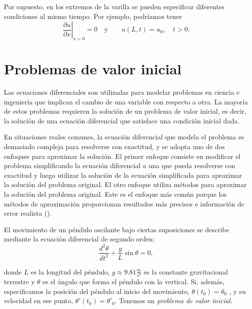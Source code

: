 \documentclass[
  spanish,
  us-letterpaper,
]{scrreprt}
\theoremstyle{definition}
\theoremstyle{plain}
\theoremstyle{remark}
\begin{document}
Por supuesto, en los extremos de la varilla se pueden especificar
diferentes condiciones al mismo tiempo. Por ejemplo, podríamos tener \[
\left. \dfrac{\partial u}{\partial x} \right|_{x=0} =0 \quad \text{y} \qquad u(L,t)=u_0, \quad t>0.
\]

\chapter{Problemas de valor inicial}\label{problemas-de-valor-inicial}

Las ecuaciones diferenciales son utilizadas para modelar problemas en
ciencia e ingeniería que implican el cambio de una variable con respecto
a otra. La mayoría de estos problemas requieren la solución de un
problema de valor inicial, es decir, la solución de una ecuación
diferencial que satisface una condición inicial dada.

En situaciones reales comunes, la ecuación diferencial que modela el
problema es demasiado compleja para resolverse con exactitud, y se
adopta uno de dos enfoques para aproximar la solución. El primer enfoque
consiste en modificar el problema simplificando la ecuación diferencial
a una que pueda resolverse con exactitud y luego utilizar la solución de
la ecuación simplificada para aproximar la solución del problema
original. El otro enfoque utiliza métodos para aproximar la solución del
problema original. Este es el enfoque más común porque los métodos de
aproximación proporcionan resultados más precisos e información de error
realista ().

\begin{tcolorbox}[enhanced jigsaw, title={Ejemplo}, left=2mm, leftrule=.75mm, coltitle=black, opacityback=0, colback=white, titlerule=0mm, toprule=.15mm, opacitybacktitle=0.6, colframe=quarto-callout-caution-color-frame, bottomtitle=1mm, colbacktitle=quarto-callout-caution-color!10!white, rightrule=.15mm, arc=.35mm, breakable, toptitle=1mm, bottomrule=.15mm]

El movimiento de un péndulo oscilante bajo ciertas suposiciones se
describe mediante la ecuación diferencial de segundo orden: \[
\dfrac{d^2 \theta}{d t^2} + \dfrac{g}{L} \sin{\theta} = 0, 
\]

donde \(L\) es la longitud del péndulo, \(g \approx 9.81 \frac{m}{s^2}\)
es la constante gravitacional terrestre y \(\theta\) es el ángulo que
forma el péndulo con la vertical. Si, además, especificamos la posición
del péndulo al inicio del movimiento, \(\theta(t_0) = \theta_{0}\) , y
su velocidad en ese punto, \(\theta'(t_0) = \theta'_0\). Tenemos un
\emph{problema de valor inicial}.

\end{tcolorbox}
\end{document}
